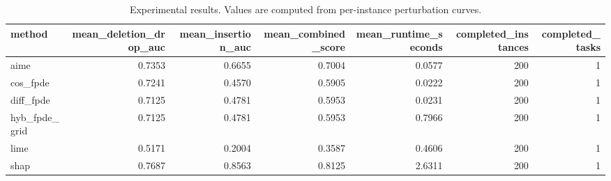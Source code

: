\begin{table}[t]
\caption{Experimental results. Values are computed from per-instance perturbation curves.}
\label{tab:main_results_computed}
\centering
\begin{tabular}{lrrrrrr}
\toprule
method & mean\_deletion\_drop\_auc & mean\_insertion\_auc & mean\_combined\_score & mean\_runtime\_seconds & completed\_instances & completed\_tasks \\
\midrule
aime & 0.7353 & 0.6655 & 0.7004 & 0.0577 & 200 & 1 \\
cos\_fpde & 0.7241 & 0.4570 & 0.5905 & 0.0222 & 200 & 1 \\
diff\_fpde & 0.7125 & 0.4781 & 0.5953 & 0.0231 & 200 & 1 \\
hyb\_fpde\_grid & 0.7125 & 0.4781 & 0.5953 & 0.7966 & 200 & 1 \\
lime & 0.5171 & 0.2004 & 0.3587 & 0.4606 & 200 & 1 \\
shap & 0.7687 & 0.8563 & 0.8125 & 2.6311 & 200 & 1 \\
\bottomrule
\end{tabular}

\end{table}
